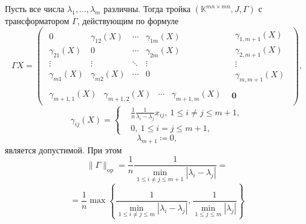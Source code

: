 \begin{ksvlem}
    Пусть все числа \( \lambda_1, \ldots, \lambda_m \) различны.
    Тогда тройка \( (\mathbb{K}^{{mn}{\times}{mn}}, J, \Gamma) \)
    с трансформатором \( \Gamma \), действующим по формуле
    \[
        \Gamma X =
        \left(\begin{array}{c|c}
            \begin{matrix}
                0               & \gamma_{12}(X) & \cdots & \gamma_{1m}(X) \\
                \gamma_{21}(X)  & 0              & \cdots & \gamma_{2m}(X) \\
                \vdots          & \vdots         & \ddots & \vdots & \ \\
                \gamma_{m1}(X)  & \gamma_{m2}(X) & \cdots & 0
            \end{matrix} &
            \begin{matrix}
                \gamma_{1,m+1}(X) \\
                \gamma_{2,m+1}(X) \\
                \vdots \\
                \gamma_{m,m+1}(X)
            \end{matrix} \\ \hline
            \begin{matrix}
                \gamma_{m{+}1,1}(X) &
                \gamma_{m{+}1,2}(X) &
                \cdots &
                \gamma_{m{+}1,m}(X)
            \end{matrix} &
            \mathbf{0}
        \end{array}\right),
        \]
    \[
        \gamma_{ij}(X) =
        \left\{\begin{aligned}
            & \frac1n \frac{1}{\lambda_i - \lambda_j} x_{ij},
              \ 1\leq i{\neq}j \leq m{+}1, \\
            & 0,
              \ 1\leq i{=}j \leq m{+}1,
        \end{aligned}\right.
        \]
    \[
        \lambda_{m+1} \coloneqq 0,
        \]
    является допустимой.
    При этом
    \[
        \|\Gamma\|_{\mathrm{op}} =
        \frac1n
        \frac{1}{\min_{1\leq i{\neq}j \leq m{+}1}|\lambda_i - \lambda_j|} =
        \]
    \[
        = \frac1n
         \max\left\{
         \frac{1}{
             \min\limits_{1\leq i{\neq}j \leq m }{|\lambda_i - \lambda_j|}},
         \frac{1}{
             \min\limits_{1\leq j \leq m}{|\lambda_j|}}
         \right\}
        \]
\end{ksvlem}

